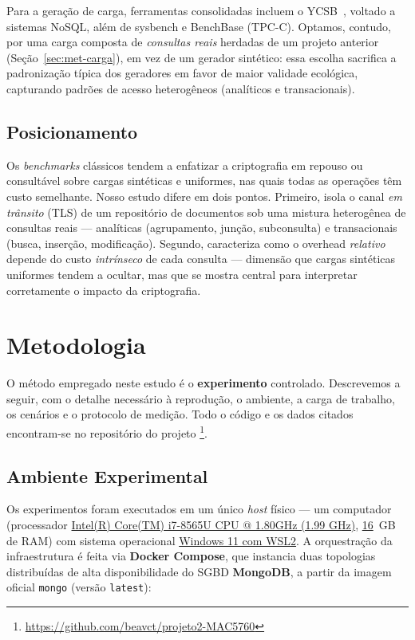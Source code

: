 \documentclass[12pt]{article}
\begin{document}
Para a geração de carga, ferramentas consolidadas incluem o
YCSB~\cite{cooper2010ycsb}, voltado a sistemas NoSQL, além de sysbench e
BenchBase (TPC-C). Optamos, contudo, por uma carga composta de \emph{consultas
reais} herdadas de um projeto anterior (Seção~\ref{sec:met-carga}), em vez de um
gerador sintético: essa escolha sacrifica a padronização típica dos geradores em
favor de maior validade ecológica, capturando padrões de acesso heterogêneos
(analíticos e transacionais).

\subsection{Posicionamento}
\label{sec:rel-lacuna}

Os \emph{benchmarks} clássicos tendem a enfatizar a criptografia em repouso ou
consultável sobre cargas sintéticas e uniformes, nas quais todas as operações têm
custo semelhante. Nosso estudo difere em dois pontos. Primeiro, isola o canal
\emph{em trânsito} (TLS) de um repositório de documentos sob uma mistura
heterogênea de consultas reais --- analíticas (agrupamento, junção, subconsulta)
e transacionais (busca, inserção, modificação). Segundo, caracteriza como o
overhead \emph{relativo} depende do custo \emph{intrínseco} de cada consulta ---
dimensão que cargas sintéticas uniformes tendem a ocultar, mas que se mostra
central para interpretar corretamente o impacto da criptografia.


\section{Metodologia}
\label{sec:metodologia}
O método empregado neste estudo é o \textbf{experimento} controlado. Descrevemos
a seguir, com o detalhe necessário à reprodução, o ambiente, a carga de trabalho,
os cenários e o protocolo de medição. Todo o código e os dados citados encontram-se
no repositório do projeto \footnote{\url{https://github.com/beavct/projeto2-MAC5760}}.

\subsection{Ambiente Experimental}
\label{sec:met-ambiente}

Os experimentos foram executados em um único \emph{host} físico --- um computador (processador \underline{Intel(R) Core(TM) i7-8565U CPU @ 1.80GHz (1.99 GHz)},
\underline{16}~GB de RAM) com sistema operacional
\underline{Windows 11 com WSL2}. A orquestração da infraestrutura é feita via \textbf{Docker Compose}, que instancia duas topologias distribuídas de alta disponibilidade do SGBD \textbf{MongoDB}, a partir da imagem oficial \texttt{mongo} (versão \texttt{latest}):
\end{document}
